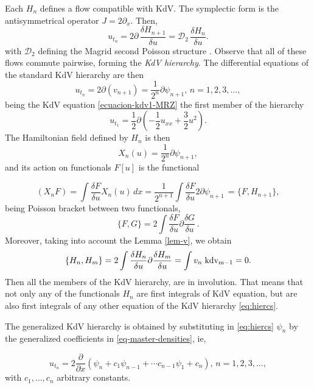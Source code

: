 \documentclass[a4paper,12pt]{article}
\newcommand{\cD}{\mathcal{D}}
\def\kdv{\rm kdv}
\newcommand{\fdiff}[2]{\dfrac{\delta #1}{\delta #2}}
\begin{document}
\color{black}

Each $H_n$ defines a flow compatible with KdV. The  symplectic form is the antisymmetrical operator $J=2\partial_x$.  Then,
        \[
          u_{t_n} = 2\partial\,\fdiff{H_{n+1}}{u} = \cD_2\,\fdiff{H_{n}}{u}.
        \]
with $\cD_2$ defining the Magrid second Poisson structure \cite{Magri1978}. Observe that all of these flows commute pairwise, forming the \emph{KdV hierarchy}. The differential equations of the standard KdV hierarchy are then
\begin{equation} \label{eq:hiercs} 
u_{t_n}= 2\partial(v_{n+1}) = \frac{1}{2^n }\partial \psi_{n+1}, \, n=1, 2, 3, ...,
\end{equation}
being the KdV equation \eqref{ecuacion-kdv1-MRZ} the first member of the hierarchy
$$ 
u_{t_1}=\frac12 \partial\left(-\dfrac 12 u_{xx}+\dfrac 32 u^2 \right).$$
 The Hamiltonian field defined by $H_n$ is then
\begin{equation}
X_n(u)=\frac{1}{2^n }\partial \psi_{n+1} ,
\end{equation}
and its action on functionals $F[u]$ is  the functional

\begin{equation}
(X_nF)=\int \dfrac {\delta F}{\delta u} X_n(u)\, dx=  \frac{1}{2^{n+1 }} \int \dfrac {\delta F}{\delta u}2\partial\psi_{n+1}\, =\{ F, H_{n+1}\},
\end{equation}
being  Poisson bracket between two functionals,
\begin{equation} \{F,G\} =2\int \dfrac {\delta F}{\delta u}\partial\dfrac {\delta G}{\delta u}\, .
\end{equation}
Moreover, taking into account the Lemma \ref{lem-v}, we obtain
\begin{equation*} \{H_n , H_m \}=2\int \dfrac {\delta H_n}{\delta u}\partial\dfrac {\delta H_m }{\delta u} = \int v_n \; \kdv_{m-1} =0 .
\end{equation*}
Then all the members of the KdV hierarchy, are in involution. That means that  not only any of the functionals $H_n$ are first integrals of KdV equation, but are also first integrals of any other equation of the KdV hierarchy \eqref{eq:hiercs}. 




The generalized KdV hierarchy is obtained by substituting in  \eqref{eq:hiercs} $\psi_n$ by the  generalized coefficients in \eqref{eq-master-densities}, ie,

\begin{equation} \label{eq:hierce} u_{t_n}=2\frac \partial {\partial x} \left(\psi_n+c_1\psi_{n-1}+\cdots c_{n-1}\psi_1+c_n\right), \, n=1, 2, 3, ...,
\end{equation}
with $c_1 , \dots ,c_n$ arbitrary constants.
\end{document}

